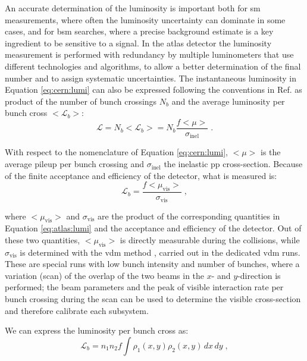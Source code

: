 An accurate determination of the luminosity is important both for \gls{sm} measurements, where often the luminosity uncertainty can dominate in some cases, and for \gls{bsm} searches, where a precise background estimate is a key ingredient to be sensitive to a signal. In the \gls{atlas} detector the luminosity measurement is performed with redundancy by multiple luminometers that use different technologies and algorithms, to allow a better determination of the final number and to assign systematic uncertainties. The instantaneous luminosity in Equation \ref{eq:cern:lumi} can also be expressed following the conventions in Ref. \cite{Aaboud:2016hhf} as product of the number of bunch crossings $N_b$ and the average luminosity per bunch cross $<\mathcal{L}_b>$:
\begin{equation}
\mathcal{L} = N_b <\mathcal{L}_b> = N_b \frac{f <\mu>}{\sigma_{\mathrm{inel}} } \; .
\label{eq:atlas:lumi}
\end{equation}

With respect to the nomenclature of Equation \ref{eq:cern:lumi}, $<\mu>$ is the average pileup per bunch crossing and $\sigma_{\mathrm{inel}}$ the inelastic \gls{pp} cross-section. Because of the finite acceptance and efficiency of the detector, what is measured is:
\begin{equation}
\mathcal{L}_b = \frac{f <\mu_\mathrm{vis}>}{\sigma_{\mathrm{vis}} } \; , \nonumber
\end{equation}

\noindent where $<\mu_\mathrm{vis}>$ and $\sigma_{\mathrm{vis}}$ are the product of the corresponding quantities in Equation \ref{eq:atlas:lumi} and the acceptance and efficiency of the detector. Out of these two quantities, $<\mu_\mathrm{vis}>$ is directly measurable during the collisions, while $\sigma_{\mathrm{vis}}$ is determined with the \gls{vdm} method \cite{vanderMeer:296752}, carried out in the dedicated \gls{vdm} runs. These are special runs with low bunch intensity and number of bunches, where a variation (scan) of the overlap of the two beams in the $x$- and $y$-direction is performed; the beam parameters and the peak of visible interaction rate per bunch crossing during the scan can be used to determine the visible cross-section and therefore calibrate each subsystem. 

We can express the luminosity per bunch cross as:
\begin{equation}
\mathcal{L}_b = n_1 n_2 f \int \rho_1(x,y) \rho_2(x,y) \, dx \, dy \; ,
\label{eq:lumi_vdm1}
\end{equation}

